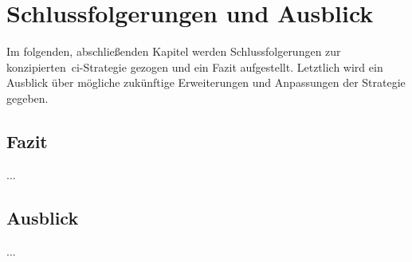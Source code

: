 
\section{Schlussfolgerungen und Ausblick} \label{sec:06-prospect}

Im folgenden, abschließenden Kapitel werden Schlussfolgerungen zur konzipierten\ \acrshort{ci}-Strategie gezogen
und ein Fazit aufgestellt.
Letztlich wird ein Ausblick über mögliche zukünftige Erweiterungen und Anpassungen der Strategie gegeben.

\subsection{Fazit} \label{subsec:06-prospect-1}

...

\clearpage

\subsection{Ausblick} \label{subsec:06-prospect-2}

...

\clearpage
